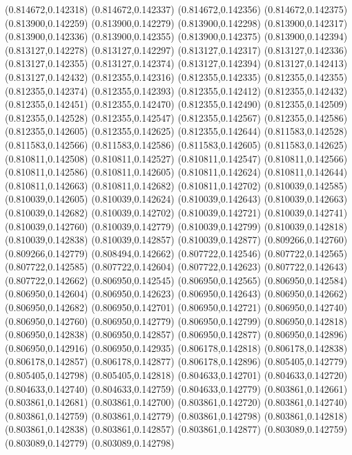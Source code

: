 (0.814672,0.142318)
(0.814672,0.142337)
(0.814672,0.142356)
(0.814672,0.142375)
(0.813900,0.142259)
(0.813900,0.142279)
(0.813900,0.142298)
(0.813900,0.142317)
(0.813900,0.142336)
(0.813900,0.142355)
(0.813900,0.142375)
(0.813900,0.142394)
(0.813127,0.142278)
(0.813127,0.142297)
(0.813127,0.142317)
(0.813127,0.142336)
(0.813127,0.142355)
(0.813127,0.142374)
(0.813127,0.142394)
(0.813127,0.142413)
(0.813127,0.142432)
(0.812355,0.142316)
(0.812355,0.142335)
(0.812355,0.142355)
(0.812355,0.142374)
(0.812355,0.142393)
(0.812355,0.142412)
(0.812355,0.142432)
(0.812355,0.142451)
(0.812355,0.142470)
(0.812355,0.142490)
(0.812355,0.142509)
(0.812355,0.142528)
(0.812355,0.142547)
(0.812355,0.142567)
(0.812355,0.142586)
(0.812355,0.142605)
(0.812355,0.142625)
(0.812355,0.142644)
(0.811583,0.142528)
(0.811583,0.142566)
(0.811583,0.142586)
(0.811583,0.142605)
(0.811583,0.142625)
(0.810811,0.142508)
(0.810811,0.142527)
(0.810811,0.142547)
(0.810811,0.142566)
(0.810811,0.142586)
(0.810811,0.142605)
(0.810811,0.142624)
(0.810811,0.142644)
(0.810811,0.142663)
(0.810811,0.142682)
(0.810811,0.142702)
(0.810039,0.142585)
(0.810039,0.142605)
(0.810039,0.142624)
(0.810039,0.142643)
(0.810039,0.142663)
(0.810039,0.142682)
(0.810039,0.142702)
(0.810039,0.142721)
(0.810039,0.142741)
(0.810039,0.142760)
(0.810039,0.142779)
(0.810039,0.142799)
(0.810039,0.142818)
(0.810039,0.142838)
(0.810039,0.142857)
(0.810039,0.142877)
(0.809266,0.142760)
(0.809266,0.142779)
(0.808494,0.142662)
(0.807722,0.142546)
(0.807722,0.142565)
(0.807722,0.142585)
(0.807722,0.142604)
(0.807722,0.142623)
(0.807722,0.142643)
(0.807722,0.142662)
(0.806950,0.142545)
(0.806950,0.142565)
(0.806950,0.142584)
(0.806950,0.142604)
(0.806950,0.142623)
(0.806950,0.142643)
(0.806950,0.142662)
(0.806950,0.142682)
(0.806950,0.142701)
(0.806950,0.142721)
(0.806950,0.142740)
(0.806950,0.142760)
(0.806950,0.142779)
(0.806950,0.142799)
(0.806950,0.142818)
(0.806950,0.142838)
(0.806950,0.142857)
(0.806950,0.142877)
(0.806950,0.142896)
(0.806950,0.142916)
(0.806950,0.142935)
(0.806178,0.142818)
(0.806178,0.142838)
(0.806178,0.142857)
(0.806178,0.142877)
(0.806178,0.142896)
(0.805405,0.142779)
(0.805405,0.142798)
(0.805405,0.142818)
(0.804633,0.142701)
(0.804633,0.142720)
(0.804633,0.142740)
(0.804633,0.142759)
(0.804633,0.142779)
(0.803861,0.142661)
(0.803861,0.142681)
(0.803861,0.142700)
(0.803861,0.142720)
(0.803861,0.142740)
(0.803861,0.142759)
(0.803861,0.142779)
(0.803861,0.142798)
(0.803861,0.142818)
(0.803861,0.142838)
(0.803861,0.142857)
(0.803861,0.142877)
(0.803089,0.142759)
(0.803089,0.142779)
(0.803089,0.142798)
